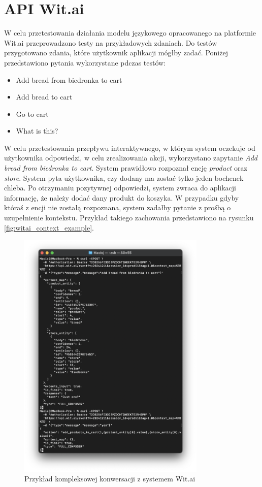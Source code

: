 \section{API Wit.ai}
\label{section:witai}
W celu przetestowania działania modelu językowego opracowanego na platformie Wit.ai przeprowadzono testy na przykładowych zdaniach. Do testów przygotowano zdania, które użytkownik aplikacji mógłby zadać. Poniżej przedstawiono pytania wykorzystane pdczas testów:

\begin{itemize}
    \item Add bread from biedronka to cart
    \item Add bread to cart
    \item Go to cart
    \item What is this?
\end{itemize}


W celu przetestowania przepływu interaktywnego, w którym system oczekuje od użytkownika odpowiedzi, w celu zrealizowania akcji, wykorzystano zapytanie \textit{Add bread from biedronka to cart}. System prawidłowo rozpoznał encję \textit{product} oraz \textit{store}. System pyta użytkownika, czy dodany ma zostać tylko jeden bochenek chleba. Po otrzymaniu pozytywnej odpowiedzi, system zwraca do aplikacji informację, że należy dodać dany produkt do koszyka. W przypadku gdyby któraś z encji nie zostałą rozpoznana, system zadałby pytanie z prośbą o uzupełnienie kontekstu. Przykład takiego zachowania przedstawiono na rysunku \ref{fig:witai_context_example}.
\begin{figure}[H]
    \centering
    \includegraphics[width=0.8\textwidth]{images/witai_complex_convo.png}
    \caption{Przykład kompleksowej konwersacji z systemem Wit.ai}
    \label{fig:witai_complex_convo}
\end{figure}


